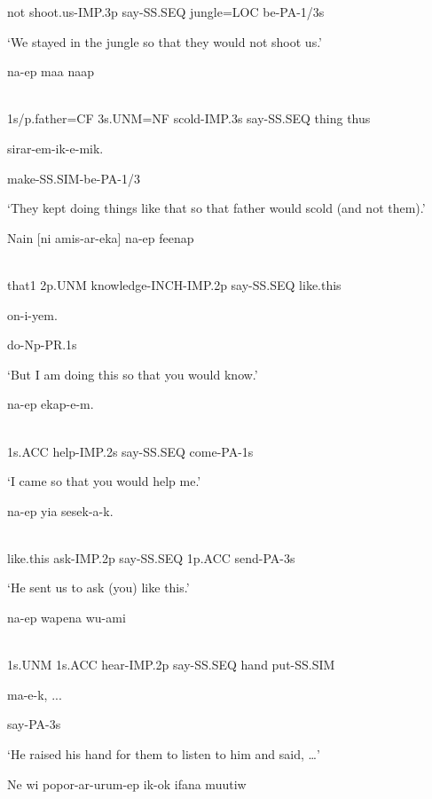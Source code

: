 not  shoot.us-IMP.3p  say-SS.SEQ  jungle=LOC  be-PA-1/3s

`We stayed in the jungle so that they would not shoot us.'

\ea%
\label{ex:x346}
\gll [Auwa=ke  o=ko  amukar-inok]  na-ep  maa  naap \\
      \\
\glt
\z

1s/p.father=CF  3s.UNM=NF  scold-IMP.3s  say-SS.SEQ  thing  thus

sirar-em-ik-e-mik.

make-SS.SIM-be-PA-1/3

`They kept doing things like that so that father would scold  (and not them).'

\ea%
\label{ex:x1615}
\gll Nain  [ni  amis-ar-eka]  na-ep  feenap \\
      \\
\glt
\z

that1  2p.UNM  knowledge-INCH-IMP.2p  say-SS.SEQ  like.this

on-i-yem. 

do-Np-PR.1s

`But I am doing this so that you would know.'

\ea%
\label{ex:x1617}
  na-ep  ekap-e-m. \\
      \\
\glt
\z

1s.ACC  help-IMP.2s  say-SS.SEQ  come-PA-1s

`I came so that you would help me.'

\ea%
\label{ex:x1618}
  na-ep  yia  sesek-a-k. \\
      \\
\glt
\z

like.this  ask-IMP.2p  say-SS.SEQ  1p.ACC  send-PA-3s

`He sent us to ask (you) like this.'

\ea%
\label{ex:x1619}
  na-ep  wapena  wu-ami \\
      \\
\glt
\z

1s.UNM  1s.ACC  hear-IMP.2p  say-SS.SEQ  hand  put-SS.SIM

ma-e-k, ...

say-PA-3s

`He raised his hand for them to listen to him and said, {\dots}'

\ea%
\label{ex:x1627}
\gll Ne  wi  popor-ar-urum-ep  ik-ok  ifana  muutiw \\
      \\
\glt
\z

